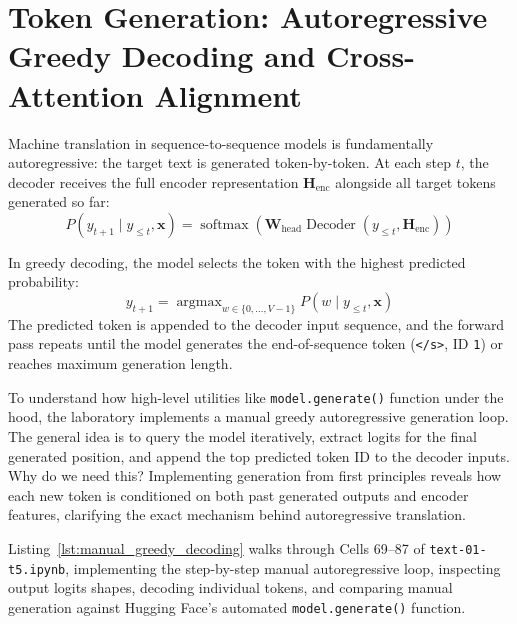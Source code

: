 \documentclass[11pt,a4paper]{article}
\begin{document}
\section{Token Generation: Autoregressive Greedy Decoding and Cross-Attention Alignment}

Machine translation in sequence-to-sequence models is fundamentally autoregressive: the target text is generated token-by-token. At each step $t$, the decoder receives the full encoder representation $\mathbf{H}_{\text{enc}}$ alongside all target tokens generated so far:
\begin{equation}
P(y_{t+1} \mid y_{\le t}, \mathbf{x}) = \operatorname{softmax}\left(\mathbf{W}_{\text{head}} \operatorname{Decoder}(y_{\le t}, \mathbf{H}_{\text{enc}})\right)
\end{equation}

In greedy decoding, the model selects the token with the highest predicted probability:
\begin{equation}
y_{t+1} = \operatorname{argmax}_{w \in \{0, \dots, V-1\}} P(w \mid y_{\le t}, \mathbf{x})
\end{equation}
The predicted token is appended to the decoder input sequence, and the forward pass repeats until the model generates the end-of-sequence token (\texttt{</s>}, ID \texttt{1}) or reaches maximum generation length.

To understand how high-level utilities like \texttt{model.generate()} function under the hood, the laboratory implements a manual greedy autoregressive generation loop. The general idea is to query the model iteratively, extract logits for the final generated position, and append the top predicted token ID to the decoder inputs. Why do we need this? Implementing generation from first principles reveals how each new token is conditioned on both past generated outputs and encoder features, clarifying the exact mechanism behind autoregressive translation.

Listing~\ref{lst:manual_greedy_decoding} walks through Cells 69--87 of \texttt{text-01-t5.ipynb}, implementing the step-by-step manual autoregressive loop, inspecting output logits shapes, decoding individual tokens, and comparing manual generation against Hugging Face's automated \texttt{model.generate()} function.
\end{document}

